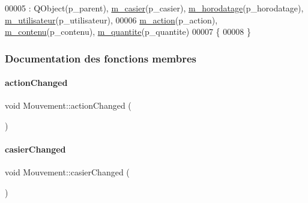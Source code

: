 \begin{DoxyCode}
00005     : QObject(p\_parent), \hyperlink{class_mouvement_a186f483cf82ff2866da1e10031838567}{m\_casier}(p\_casier), \hyperlink{class_mouvement_a24f34a74c17068f6c98635400862adcd}{m\_horodatage}(p\_horodatage), 
      \hyperlink{class_mouvement_adee253bf00365d1cb4c45bd58d8b3e58}{m\_utilisateur}(p\_utilisateur),
00006       \hyperlink{class_mouvement_af0444a7f837bdf252f2a3ccd4eb8a701}{m\_action}(p\_action), \hyperlink{class_mouvement_a631b133243576c36fec6e1912415d7d6}{m\_contenu}(p\_contenu), \hyperlink{class_mouvement_ab6040d52ca99ef88d253b1742e70ffd3}{m\_quantite}(p\_quantite)
00007 \{
00008 \}
\end{DoxyCode}


\subsubsection{Documentation des fonctions membres}
\mbox{\label{class_mouvement_a85298817bf89c88362f1b9b6478b5d87}} 
\paragraph{\texorpdfstring{action\+Changed}{actionChanged}}
{\footnotesize\ttfamily void Mouvement\+::action\+Changed (\begin{DoxyParamCaption}{ }\end{DoxyParamCaption})\hspace{0.3cm}{\ttfamily [signal]}}

\mbox{\label{class_mouvement_ae91304e04f2fdc7cc6e5b6cfe0796fb3}} 
\paragraph{\texorpdfstring{casier\+Changed}{casierChanged}}
{\footnotesize\ttfamily void Mouvement\+::casier\+Changed (\begin{DoxyParamCaption}{ }\end{DoxyParamCaption})\hspace{0.3cm}{\ttfamily [signal]}}

\mbox{\label{class_mouvement_ad9451ba92231f84fe9659e4d73d6ff41}} 

